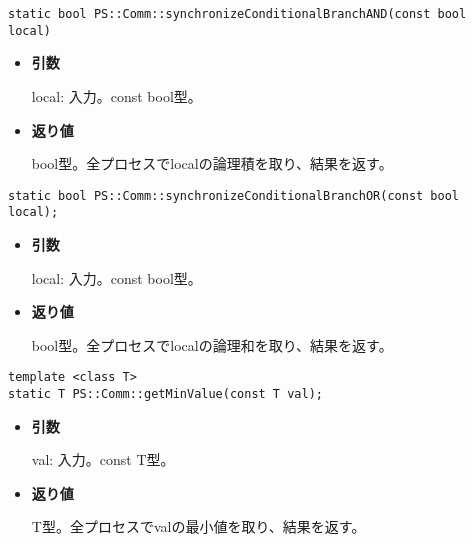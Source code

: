 
\begin{screen}
\begin{verbatim}
static bool PS::Comm::synchronizeConditionalBranchAND(const bool local)
\end{verbatim}
\end{screen}

\begin{itemize}

\item{{\bf 引数}}

local: 入力。const bool型。

\item{{\bf 返り値}}

bool型。全プロセスでlocalの論理積を取り、結果を返す。

\end{itemize}


\begin{screen}
\begin{verbatim}
static bool PS::Comm::synchronizeConditionalBranchOR(const bool local);
\end{verbatim}
\end{screen}

\begin{itemize}

\item{{\bf 引数}}

local: 入力。const bool型。

\item{{\bf 返り値}}

bool型。全プロセスでlocalの論理和を取り、結果を返す。

\end{itemize}


\begin{screen}
\begin{verbatim}
template <class T>
static T PS::Comm::getMinValue(const T val);
\end{verbatim}
\end{screen}

\begin{itemize}

\item{{\bf 引数}}

val: 入力。const T型。

\item{{\bf 返り値}}

T型。全プロセスでvalの最小値を取り、結果を返す。

\end{itemize}

